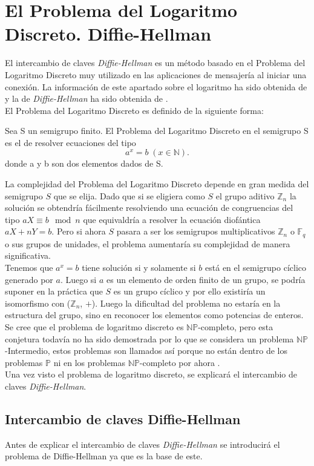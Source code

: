 \section{El Problema del Logaritmo Discreto. Diffie-Hellman}
El intercambio de claves \emph{Diffie-Hellman} es un método basado en el Problema del Logaritmo Discreto muy utilizado en las aplicaciones de mensajería al iniciar una conexión. La información de este apartado sobre el logaritmo ha sido obtenida de \cite{angelRiosMateos} y la de \emph{Diffie-Hellman} ha sido obtenida de \cite{En2011}.\\
El Problema del Logaritmo Discreto es definido de la siguiente forma:
\begin{definicion}
	Sea S un semigrupo finito. El Problema del Logaritmo Discreto en el semigrupo S es el de resolver ecuaciones del tipo\\
		$$
			a^x\!=b\;(x\in \mathbb{N}).
		$$
	donde a y b son dos elementos dados de S.
\end{definicion}

La complejidad del Problema del Logaritmo Discreto depende en gran medida del semigrupo $S$ que se elija.
Dado que si se eligiera como $S$ el grupo aditivo $\mathbb{Z}_n$ la solución se obtendría fácilmente resolviendo una ecuación de congruencias del tipo $aX \equiv b \mod n$ que equivaldría a resolver la ecuación diofántica $aX + nY = b$. Pero si ahora $S$ pasara a ser los semigrupos multiplicativos $\mathbb{Z}_n$ o $\mathbb{F}_q$ o sus grupos de unidades, el problema aumentaría su complejidad de manera significativa.\\
Tenemos que $a^x = b$ tiene solución si y solamente si $b$ está en el semigrupo cíclico generado por $a$. Luego si $a$ es un elemento de orden finito de un grupo, se podría suponer en la práctica que $S$ es un grupo cíclico y por ello existiría un isomorfismo con ($\mathbb{Z}_n$, $+$). Luego la dificultad del problema no estaría en la estructura del grupo, sino en reconocer los elementos como potencias de enteros.\\
Se cree que el problema de logaritmo discreto es $\mathbb{NP}$-completo, pero esta conjetura todavía no ha sido demostrada por lo que se considera un problema $\mathbb{NP}$-Intermedio, estos problemas son llamados así porque no están dentro de los problemas $\mathbb{P}$ ni en los problemas $\mathbb{NP}$-completo por ahora \cite{NP-intermedio}.\\
Una vez visto el problema de logaritmo discreto, se explicará el intercambio de claves \emph{Diffie-Hellman}.
\subsection{Intercambio de claves Diffie-Hellman}
Antes de explicar el intercambio de claves \emph{Diffie-Hellman} se introducirá el problema de Diffie-Hellman ya que es la base de este.\\

